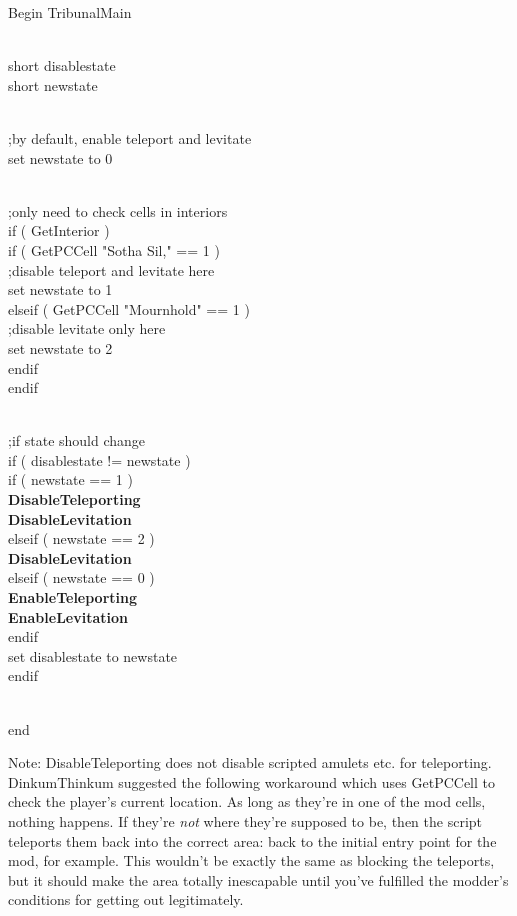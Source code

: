 \documentclass[
]{article}
\begin{document}
Begin TribunalMain\\
\strut \\
short disablestate\\
short newstate\\
\strut \\
;by default, enable teleport and levitate\\
set newstate to 0\\
\strut \\
;only need to check cells in interiors\\
if ( GetInterior )\\
if ( GetPCCell "Sotha Sil," == 1 )\\
;disable teleport and levitate here\\
set newstate to 1\\
elseif ( GetPCCell "Mournhold" == 1 )\\
;disable levitate only here\\
set newstate to 2\\
endif\\
endif\\
\strut \\
;if state should change\\
if ( disablestate != newstate )\\
if ( newstate == 1 )\\
\textbf{DisableTeleporting\\
DisableLevitation}\\
elseif ( newstate == 2 )\\
\textbf{DisableLevitation\\
} elseif ( newstate == 0 )\\
\textbf{EnableTeleporting\\
EnableLevitation\\
} endif\\
set disablestate to newstate\\
endif\\
\strut \\
end

Note: DisableTeleporting does not disable scripted amulets etc. for
teleporting. DinkumThinkum suggested the following workaround which uses
GetPCCell to check the player's current location. As long as they're in
one of the mod cells, nothing happens. If they're \emph{not} where
they're supposed to be, then the script teleports them back into the
correct area: back to the initial entry point for the mod, for example.
This wouldn't be exactly the same as blocking the teleports, but it
should make the area totally inescapable until you've fulfilled the
modder's conditions for getting out legitimately.
\end{document}

